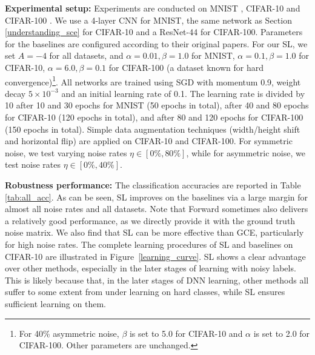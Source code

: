 \documentclass[10pt,twocolumn,letterpaper]{article}
\begin{document}
\noindent\textbf{Experimental setup:} 
Experiments are conducted on MNIST \cite{lecun1998gradient}, CIFAR-10 \cite{krizhevsky2009learning} and CIFAR-100 \cite{krizhevsky2009learning}. We use a 4-layer CNN for MNIST, the same network as Section \ref{understanding_sce} for CIFAR-10 and a ResNet-44 \cite{he2016deep} for CIFAR-100. Parameters for the baselines are configured according to their original papers. For our SL, we set $A = -4$ for all datasets, and $\alpha = 0.01, \beta = 1.0$ for MNIST, $\alpha = 0.1, \beta = 1.0$ for CIFAR-10, $\alpha = 6.0, \beta = 0.1$ for CIFAR-100 (a dataset known for hard convergence)\footnote{For 40\% asymmetric noise, $\beta$ is set to 5.0 for CIFAR-10 and $\alpha$ is set to 2.0 for CIFAR-100. Other parameters are unchanged.}. All networks are trained using SGD with momentum 0.9, weight decay $5 \times 10^{-3}$ and an initial learning rate of 0.1. The learning rate is divided by 10 after 10 and 30 epochs for MNIST (50 epochs in total), after 40 and 80 epochs for CIFAR-10 (120 epochs in total), and after 80 and 120 epochs for CIFAR-100 (150 epochs in total). Simple data augmentation techniques (width/height shift and horizontal flip) are applied on CIFAR-10 and CIFAR-100. For symmetric noise, we test varying noise rates $\eta \in [0\%, 80\%]$, while for asymmetric noise, we test noise rates $\eta \in [0\%, 40\%]$. 

\noindent\textbf{Robustness performance:} The classification accuracies are reported in Table \ref{tab:all_acc}. As can be seen, SL improves on the baselines via a large margin for almost all noise rates and all datasets. Note that Forward sometimes also delivers a relatively good performance, as we directly provide it with the ground truth noise matrix. We also find that SL can be more effective than GCE, particularly for high noise rates. The complete learning procedures of SL and baselines on CIFAR-10 are illustrated in Figure~\ref{learning_curve}. SL shows a clear advantage over other methods, especially in the later stages of learning with noisy labels. This is likely because that, in the later stages of DNN learning, other methods all suffer to some extent from under learning on hard classes, while SL ensures sufficient learning on them. 
\end{document}
